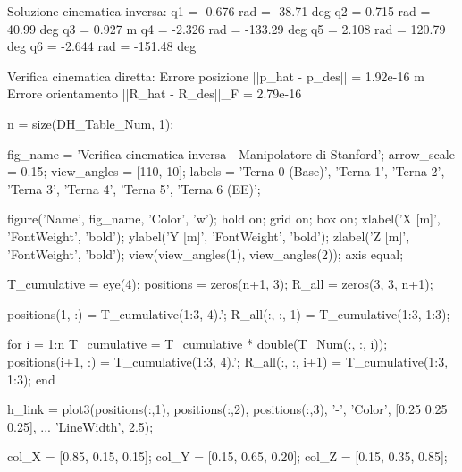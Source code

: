 \documentclass[11pt, a4paper]{article}
\begin{document}
\begin{matlaboutput}
Soluzione cinematica inversa:
q1 = -0.676 rad = -38.71 deg
q2 = 0.715 rad = 40.99 deg
q3 = 0.927 m
q4 = -2.326 rad = -133.29 deg
q5 = 2.108 rad = 120.79 deg
q6 = -2.644 rad = -151.48 deg

Verifica cinematica diretta:
Errore posizione ||p_hat - p_des||   = 1.92e-16 m
Errore orientamento ||R_hat - R_des||_F = 2.79e-16
\end{matlaboutput}


\begin{matlabcode}
n = size(DH_Table_Num, 1);

fig_name    = 'Verifica cinematica inversa - Manipolatore di Stanford';
arrow_scale = 0.15;
view_angles = [110, 10];
labels      = {'Terna 0 (Base)', 'Terna 1', 'Terna 2', 'Terna 3', 'Terna 4', 'Terna 5', 'Terna 6 (EE)'};

figure('Name', fig_name, 'Color', 'w');
hold on;
grid on;
box on;
xlabel('X [m]', 'FontWeight', 'bold');
ylabel('Y [m]', 'FontWeight', 'bold');
zlabel('Z [m]', 'FontWeight', 'bold');
view(view_angles(1), view_angles(2));
axis equal;

T_cumulative = eye(4);
positions = zeros(n+1, 3);
R_all     = zeros(3, 3, n+1);

positions(1, :) = T_cumulative(1:3, 4).';
R_all(:, :, 1)  = T_cumulative(1:3, 1:3);

for i = 1:n
    T_cumulative = T_cumulative * double(T_Num(:, :, i));
    positions(i+1, :) = T_cumulative(1:3, 4).';
    R_all(:, :, i+1)  = T_cumulative(1:3, 1:3);
end

h_link = plot3(positions(:,1), positions(:,2), positions(:,3), '-', 'Color', [0.25 0.25 0.25], ...
    'LineWidth', 2.5);

col_X = [0.85, 0.15, 0.15];
col_Y = [0.15, 0.65, 0.20];
col_Z = [0.15, 0.35, 0.85];
\end{matlabcode}
\newpage
\end{document}
